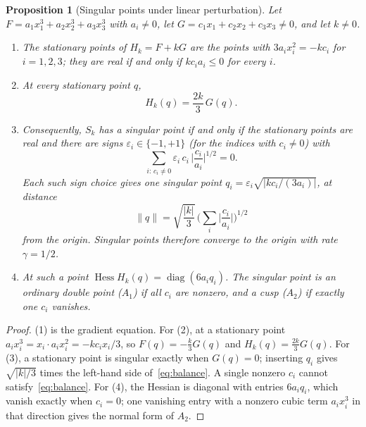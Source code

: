 \documentclass[12pt, a4paper, oneside]{book}
\theoremstyle{plain}
\newtheorem{proposition}[theorem]{Proposition}
\theoremstyle{definition}
\theoremstyle{remark}
\begin{document}
\begin{proposition}[Singular points under linear perturbation]
\label{prop:linear}
Let $F=a_1x_1^3+a_2x_2^3+a_3x_3^3$ with $a_i\neq0$, let
$G=c_1x_1+c_2x_2+c_3x_3\neq0$, and let $k\neq0$.
\begin{enumerate}
    \item The stationary points of $H_k=F+kG$ are the points with
          $3a_ix_i^2=-kc_i$ for $i=1,2,3$; they are real if and only if
          $kc_ia_i\le0$ for every $i$.
    \item At every stationary point $q$,
          \begin{equation}
          \label{eq:level-at-stationary}
          H_k(q)=\frac{2k}{3}\,G(q).
          \end{equation}
    \item Consequently, $S_k$ has a singular point if and only if the
          stationary points are real and there are signs
          $\varepsilon_i\in\{-1,+1\}$ (for the indices with $c_i\neq0$) with
          \begin{equation}
          \label{eq:balance}
          \sum_{i:\,c_i\neq0}\varepsilon_i\,c_i\,\Big|\frac{c_i}{a_i}\Big|^{1/2}=0 .
          \end{equation}
          Each such sign choice gives one singular point
          $q_i=\varepsilon_i\sqrt{|kc_i/(3a_i)|}$, at distance
          \begin{equation}
          \label{eq:singular-distance}
          \|q\|=\sqrt{\frac{|k|}{3}}\,\Big(\sum_i\Big|\frac{c_i}{a_i}\Big|\Big)^{1/2}
          \end{equation}
          from the origin. Singular points therefore converge to the origin
          with rate $\gamma=1/2$.
    \item At such a point $\operatorname{Hess}H_k(q)=\operatorname{diag}(6a_iq_i)$.
          The singular point is an ordinary double point ($A_1$) if all $c_i$
          are nonzero, and a cusp ($A_2$) if exactly one $c_i$ vanishes.
\end{enumerate}
\end{proposition}

\begin{proof}
(1) is the gradient equation. For (2), at a stationary point
$a_ix_i^3=x_i\cdot a_ix_i^2=-kc_ix_i/3$, so $F(q)=-\tfrac k3G(q)$ and
$H_k(q)=\tfrac{2k}{3}G(q)$. For (3), a stationary point is singular exactly
when $G(q)=0$; inserting $q_i$ gives $\sqrt{|k|/3}$ times the left-hand side
of~\eqref{eq:balance}. A single nonzero $c_i$ cannot satisfy~\eqref{eq:balance}.
For (4), the Hessian is diagonal with entries $6a_iq_i$, which vanish exactly
when $c_i=0$; one vanishing entry with a nonzero cubic term $a_ix_i^3$ in that
direction gives the normal form of $A_2$.
\end{proof}
\end{document}
